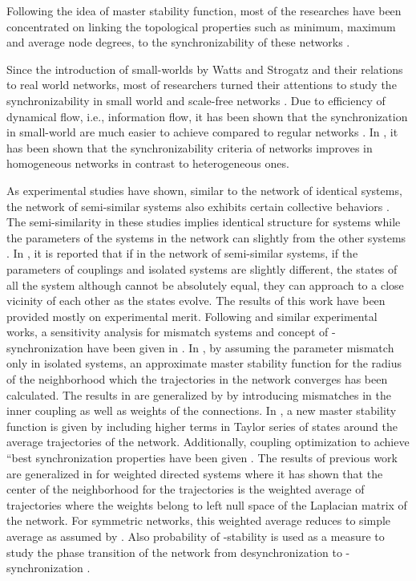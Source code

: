 \documentclass[conference]{IEEEtran}
\begin{document}
Following the idea of master stability function, most of the researches have been concentrated on linking the topological properties such as minimum, maximum and average node degrees, to the synchronizability of these networks \cite{Motter07,Wang02,Manaffam13,Zhou06}. 

Since the introduction of small-worlds by Watts and Strogatz and their relations to real world networks, most of researchers turned their attentions to study the synchronizability in small world and scale-free networks \cite{Watts98,Newman10,Newman10}. Due to efficiency of dynamical flow, i.e., information flow, it has been shown that the synchronization in small-world are much easier to achieve compared to regular networks \cite{Arenas08,Manaffam13,Wu08}. In  \cite{Nishikawa03}, it has been shown that the synchronizability criteria of networks improves in homogeneous networks in contrast to heterogeneous ones.

As experimental studies have shown, similar to the network of identical systems, the network of semi-similar systems also exhibits certain collective behaviors \cite{Restrepo04, Sun09, Sorrentino11,Acharyya12,Manaffam15}. The semi-similarity in these studies implies identical structure for systems while the parameters of the systems in the network can slightly from the other systems \cite{Restrepo04, Sun09, Sorrentino11, Acharyya12,Manaffam15}. In \cite{Restrepo04}, it is reported that if in the network of semi-similar systems, if the parameters of couplings and isolated systems are slightly different, the states of all the system although cannot be absolutely equal, they can approach to a close vicinity of each other as the states evolve. The results of this work have been provided mostly on experimental merit. Following \cite{Restrepo04} and similar experimental works, a sensitivity analysis for mismatch systems and concept of -synchronization have been given in \cite{Sun09, Sorrentino11, Acharyya12}. In \cite{Sun09}, by assuming the parameter mismatch only in isolated systems, an approximate master stability function for the radius of the neighborhood which the trajectories in the network converges has been calculated. The results in \cite{Sun09} are generalized by \cite{Sorrentino11} by introducing mismatches in the inner coupling as well as weights of the connections. In \cite{Acharyya12}, a new master stability function is given by including higher terms in Taylor series of states around the average trajectories of the network. Additionally, coupling optimization to achieve ``best synchronization properties have been given \cite{Acharyya12}. The results of previous work are generalized in \cite{Manaffam15} for weighted directed systems where it has shown that the center of the neighborhood for the trajectories is the weighted average of trajectories where the weights belong to left null space of the Laplacian matrix of the network. For symmetric networks, this weighted average reduces to simple average as assumed by \cite{Restrepo04, Sun09, Sorrentino11, Acharyya12}. Also probability of -stability is used as a measure to study the phase transition of the network from desynchronization to -synchronization \cite{Manaffam15}.
\end{document}
